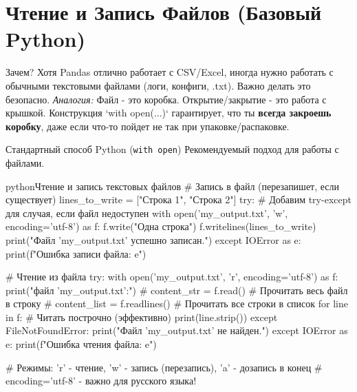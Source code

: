 \section{Чтение и Запись Файлов (Базовый Python)}

\begin{textbox}{Зачем?}
    Хотя Pandas отлично работает с CSV/Excel, иногда нужно работать с обычными текстовыми файлами (логи, конфиги, .txt). Важно делать это безопасно.
    \textit{Аналогия:} Файл - это коробка. Открытие/закрытие - это работа с крышкой. Конструкция `with open(...)` гарантирует, что ты \textbf{всегда закроешь коробку}, даже если что-то пойдет не так при упаковке/распаковке.
\end{textbox}

\begin{myblock}{{Стандартный способ Python (\texttt{with open})}}
    Рекомендуемый подход для работы с файлами.
    \begin{codebox}{python}{Чтение и запись текстовых файлов}
    # Запись в файл (перезапишет, если существует)
    lines_to_write = ["Строка 1\n", "Строка 2\n"]
    try: # Добавим try-except для случая, если файл недоступен
        with open('my_output.txt', 'w', encoding='utf-8') as f:
            f.write("Одна строка\n")
            f.writelines(lines_to_write)
        print("Файл 'my_output.txt' успешно записан.")
    except IOError as e:
        print(f"Ошибка записи файла: {e}")

    # Чтение из файла
    try:
        with open('my_output.txt', 'r', encoding='utf-8') as f:
            print(" файл 'my_output.txt':")
            # content_str = f.read()      # Прочитать весь файл в строку
            # content_list = f.readlines() # Прочитать все строки в список
            for line in f:             # Читать построчно (эффективно)
                print(line.strip())
    except FileNotFoundError:
        print("Файл 'my_output.txt' не найден.")
    except IOError as e:
         print(f"Ошибка чтения файла: {e}")


    # Режимы: 'r' - чтение, 'w' - запись (перезапись), 'a' - дозапись в конец
    # encoding='utf-8' - важно для русского языка!
    \end{codebox}
\end{myblock}

